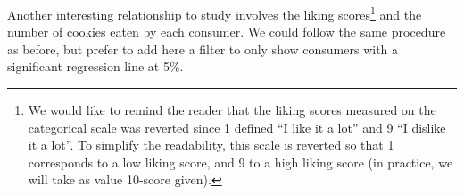 \documentclass[
]{book}
\newenvironment{Shaded}{\begin{snugshade}}{\end{snugshade}}
\newcommand{\AttributeTok}[1]{\textcolor[rgb]{0.77,0.63,0.00}{#1}}
\newcommand{\ConstantTok}[1]{\textcolor[rgb]{0.00,0.00,0.00}{#1}}
\newcommand{\DecValTok}[1]{\textcolor[rgb]{0.00,0.00,0.81}{#1}}
\newcommand{\FunctionTok}[1]{\textcolor[rgb]{0.00,0.00,0.00}{#1}}
\newcommand{\NormalTok}[1]{#1}
\newcommand{\SpecialCharTok}[1]{\textcolor[rgb]{0.00,0.00,0.00}{#1}}
\newcommand{\StringTok}[1]{\textcolor[rgb]{0.31,0.60,0.02}{#1}}
\begin{document}
\begin{Shaded}
\end{Shaded}

Another interesting relationship to study involves the liking scores\footnote{We would like to remind the reader that the liking scores measured on the categorical scale was reverted since 1 defined ``I like it a lot'' and 9 ``I dislike it a lot''. To simplify the readability, this scale is reverted so that 1 corresponds to a low liking score, and 9 to a high liking score (in practice, we will take as value 10-score given).} and the number of cookies eaten by each consumer. We could follow the same procedure as before, but prefer to add here a filter to only show consumers with a significant regression line at 5\%.
\end{document}
